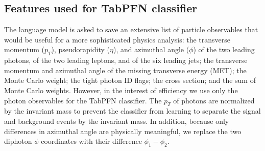\documentclass[aps,prd,reprint,superscriptaddress]{revtex4-2}
\begin{document}










\subsection{Features used for TabPFN classifier}
The language model is asked to save an extensive list of particle observables that would be useful for a more sophisticated physics analysis: the transverse momentum ($p_T$), pseudorapidity ($\eta$), and azimuthal angle ($\phi$) of the two leading photons, of the two leading leptons, and of the six leading jets; the transverse momentum and azimuthal angle of the missing transverse energy (MET); the Monte Carlo weight; the tight photon ID flags; the cross section; and the sum of Monte Carlo weights. However, in the interest of efficiency we use only the photon observables for the TabPFN classifier. The $p_T$ of photons are normalized by the invariant mass to prevent the classifier from learning to separate the signal and background events by the invariant mass. In addition, because only differences in azimuthal angle are physically meaningful, we replace the two diphoton $\phi$ coordinates with their difference $\phi_1 - \phi_2$.
\end{document}
